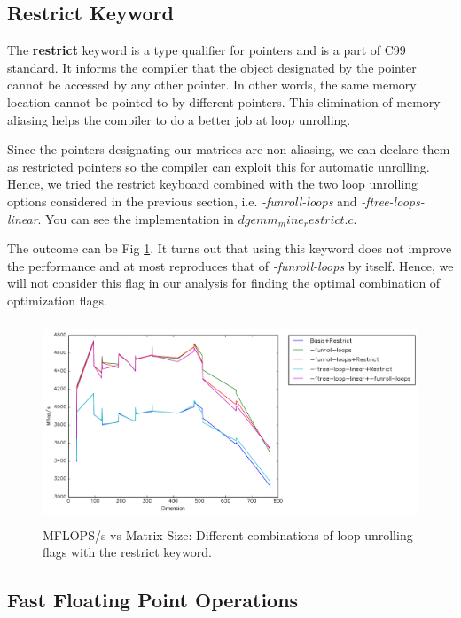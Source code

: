 \documentclass{article}
\begin{document}
\subsection{Restrict Keyword}

The {\bf restrict} keyword is a type qualifier for pointers and is a part of C99 standard. It informs the compiler that the object designated by the pointer cannot be accessed by any other pointer. In other words, the same memory location cannot be pointed to by different pointers. This elimination of memory aliasing helps the compiler to do a better job at loop unrolling.

Since the pointers designating our matrices are non-aliasing, we can declare them as restricted pointers so the compiler can exploit this for automatic unrolling. 
Hence, we tried the restrict keyboard combined with the two loop unrolling options considered in the previous section, i.e. \textit{-funroll-loops} and \textit{-ftree-loops-linear}. You can see the implementation in $dgemm_mine_restrict.c$.

The outcome can be Fig \ref{fig:restrict}. It turns out that using this keyword does not improve the performance and at most reproduces that of \textit{-funroll-loops} by itself. Hence, we will not consider this flag in our analysis for finding the optimal combination of optimization flags.


    \begin{figure}[h]
    \centering
    \includegraphics[width=14cm,height=6cm]{timing-restrict-final.pdf}
    \caption{MFLOPS/s vs Matrix Size: Different combinations of loop unrolling flags with the restrict keyword.}
    \label{fig:restrict}
  \end{figure}

\subsection{Fast Floating Point Operations}
\end{document}
